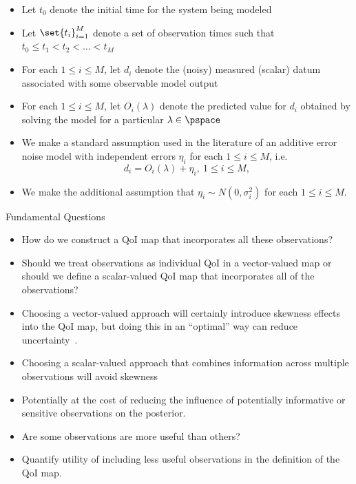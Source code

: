 \begin{frame}[t]
\begin{itemize}[<+->]
	\item Let $t_0$ denote the initial time for the system being modeled 
	\item Let $\set{t_i}_{i=1}^M$ denote a set of observation times such that $t_0\leq t_1<t_2<\ldots<t_M$
	\item For each $1\leq i\leq M$, let $d_i$ denote the (noisy) measured (scalar) datum associated with some observable model output
	\item For each $1\leq i\leq M$, let $O_i(\lambda)$ denote the predicted value for $d_i$ obtained by solving the model for a particular $\lambda\in\pspace$
	\item We make a standard assumption used in the literature \cite{Smith, Barron, Silverman, Walpole} of an additive error noise model with independent errors $\eta_i$ for each $1\leq i\leq M$, i.e.
	\begin{equation}\label{eq:obs_data_error}
	d_i = O_i(\lambda) + \eta_i, \ 1\leq i\leq M,
\end{equation}
	\item We make the additional assumption that $\eta_i\sim N(0,\sigma_i^2)$ for each $1\leq i\leq M$.
\end{itemize}


\end{frame}


\begin{frame}[t]{Fundamental Questions}
\begin{itemize}[<+->]
	\item How do we construct a QoI map that incorporates all these observations?
	\item Should we treat observations as individual QoI in a vector-valued map or should we define a scalar-valued QoI map that incorporates all of the observations?
	\item Choosing a vector-valued approach will certainly introduce skewness effects into the QoI map, but doing this in an ``optimal'' way can reduce uncertainty~\cite{Walsh}.
	\item Choosing a scalar-valued approach that combines information across multiple observations will avoid skewness 
	\item Potentially at the cost of reducing the influence of potentially informative or sensitive observations on the posterior.
	\item Are some observations are more useful than others?
	\item Quantify utility of including less useful observations in the definition of the QoI map.
\end{itemize}

\end{frame}


